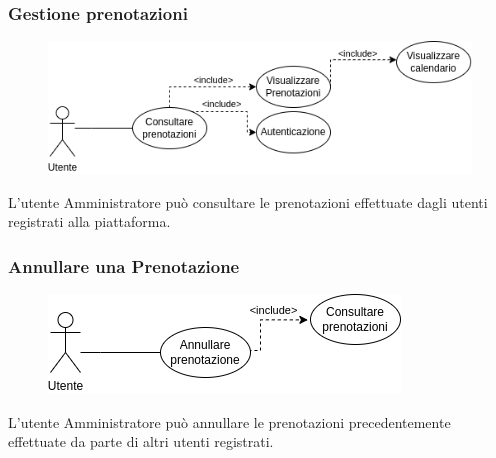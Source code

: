 \documentclass{article}
\begin{document}
\subsubsection{Gestione prenotazioni}\label{rf_3}
\begin{description}

	\begin{figure}[htp]
	\centering
	\includegraphics[width=\textwidth]{rf3.png}
	\end{figure}

    \item L'utente Amministratore può consultare le prenotazioni effettuate dagli utenti registrati alla piattaforma.
\end{description}

\renewcommand\thesubsubsection{RF 4}
\subsubsection{Annullare una Prenotazione}\label{rf_4}
\begin{description}

	\begin{figure}[htp]
	\centering
	\includegraphics[]{rf4.png}
	\end{figure}

    \item L'utente Amministratore può annullare le prenotazioni precedentemente effettuate da parte di altri utenti registrati.
\end{description}

\clearpage

\renewcommand\thesubsubsection{RF 5}
\end{document}
